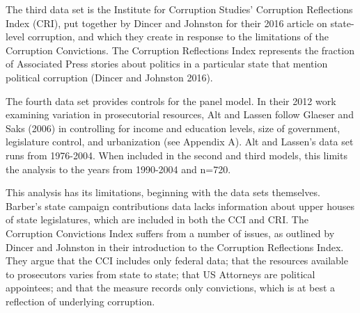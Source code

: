 \documentclass{jopsubmission}
\begin{document}
The third data set is the Institute for Corruption Studies' Corruption
Reflections Index (CRI), put together by Dincer and Johnston for their
2016 article on state-level corruption, and which they create in
response to the limitations of the Corruption Convictions. The
Corruption Reflections Index represents the fraction of Associated Press
stories about politics in a particular state that mention political
corruption (Dincer and Johnston 2016).

\begin{table}[!htbp] \centering 
  \caption{Descriptive Statistics for Corruption and Reflections} 
  \label{} 
\end{table}

The fourth data set provides controls for the panel model. In their 2012
work examining variation in prosecutorial resources, Alt and Lassen
follow Glaeser and Saks (2006) in controlling for income and education
levels, size of government, legislature control, and urbanization (see
Appendix A). Alt and Lassen's data set runs from 1976-2004. When
included in the second and third models, this limits the analysis to the
years from 1990-2004 and n=720.

This analysis has its limitations, beginning with the data sets
themselves. Barber's state campaign contributions data lacks information
about upper houses of state legislatures, which are included in both the
CCI and CRI. The Corruption Convictions Index suffers from a number of
issues, as outlined by Dincer and Johnston in their introduction to the
Corruption Reflections Index. They argue that the CCI includes only
federal data; that the resources available to prosecutors varies from
state to state; that US Attorneys are political appointees; and that the
measure records only convictions, which is at best a reflection of
underlying corruption.
\end{document}
